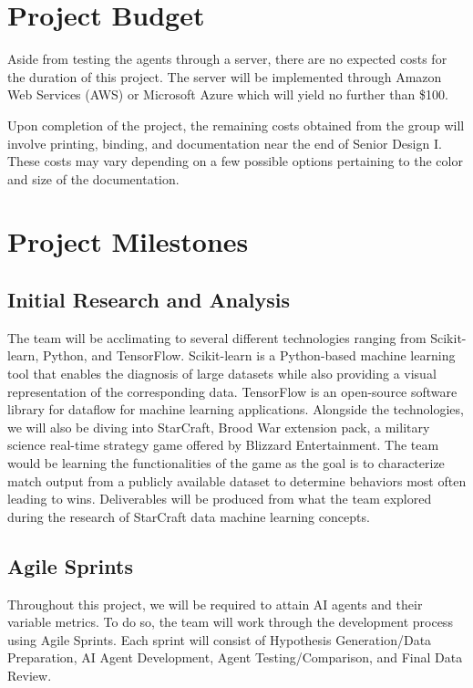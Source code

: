 \documentclass[a4paper,12pt]{report}
\begin{document}
\section{Project Budget}

Aside from testing the agents through a server, there are no expected costs for the duration of this project. The server will be implemented through Amazon Web Services (AWS) or Microsoft Azure which will yield no further than \$100.

Upon completion of the project, the remaining costs obtained from the group will involve printing, binding, and documentation near the end of Senior Design I. These costs may vary depending on a few possible options pertaining to the color and size of the documentation.

\section{Project Milestones}

\subsection{Initial Research and Analysis}

The team will be acclimating to several different technologies ranging from Scikit-learn, Python, and TensorFlow. Scikit-learn is a Python-based machine learning tool that enables the diagnosis of large datasets while also providing a visual representation of the corresponding data. TensorFlow is an open-source software library for dataflow for machine learning applications. Alongside the technologies, we will also be diving into StarCraft, Brood War extension pack, a military science real-time strategy game offered by Blizzard Entertainment. The team would be learning the functionalities of the game as the goal is to characterize match output from a publicly available dataset to determine behaviors most often leading to wins. Deliverables will be produced from what the team explored during the research of StarCraft data machine learning concepts.

\subsection{Agile Sprints}

Throughout this project, we will be required to attain AI agents and their variable metrics. To do so, the team will work through the development process using Agile Sprints. Each sprint will consist of Hypothesis Generation/Data Preparation, AI Agent Development, Agent Testing/Comparison, and Final Data Review.
\end{document}
